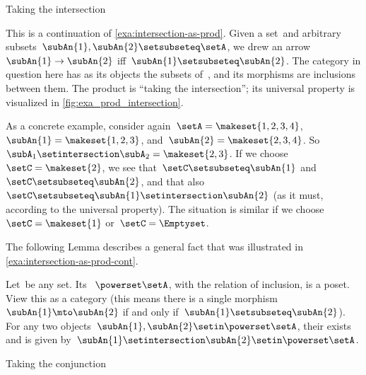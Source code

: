 \begin{marginfigure}
    \centering
    \caption{Taking the intersection}
    \label{fig:exa_prod_intersection_cont}
\end{marginfigure}

\begin{example}
    \label{exa:intersection-as-prod-cont}
    This is a continuation of \cref{exa:intersection-as-prod}.
    Given a set~\setA and arbitrary subsets~$\subAn{1}, \subAn{2} \setsubseteq \setA$, we drew an arrow~$\subAn{1} \to \subAn{2}$ iff~$\subAn{1} \setsubseteq \subAn{2}$.
    The category in question here has as its objects the subsets of~\setA, and its morphisms are inclusions between them.
    The product is ``taking the intersection''; its universal property is visualized in \cref{fig:exa_prod_intersection}.

    As a concrete example, consider again~$\setA = \makeset{ 1, 2, 3, 4 }$,~$\subAn{1} = \makeset{ 1, 2, 3 }$, and~$\subAn{2} = \makeset{2, 3, 4 }$.
    So~$\subA_1 \setintersection \subA_2 = \makeset{2, 3 }$.
    If we choose~$\setC = \makeset{ 2 }$, we see that~$\setC \setsubseteq \subAn{1}$ and~$\setC \setsubseteq \subAn{2}$, and that also~$\setC \setsubseteq \subAn{1} \setintersection \subAn{2}$ (as it must, according to the universal property).
    The situation is similar if we choose~$\setC = \makeset{ 1}$ or~$\setC = \Emptyset$.
\end{example}

The following Lemma describes a general fact that was illustrated in \cref{exa:intersection-as-prod-cont}.
\begin{lemma}
    \label{lem:cat-product-powerset}
    Let~\setA be any set.
    Its ~$\powerset \setA$, with the relation of inclusion, is a poset.
    View this  as a category (this means there is a single morphism~$\subAn{1} \mto \subAn{2}$ if and only if~$\subAn{1} \setsubseteq \subAn{2}$).
    For any two objects~$\subAn{1}, \subAn{2} \setin \powerset \setA$, their  exists and is given by~$\subAn{1} \setintersection \subAn{2} \setin \powerset \setA$.
\end{lemma}

\begin{marginfigure}
    \centering
    \caption{Taking the conjunction}
    \label{fig:exa_prod_conjunction_cont}
\end{marginfigure}

